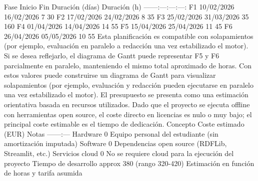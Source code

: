{}\markdownRendererPipe{} Fase \markdownRendererPipe{} Inicio \markdownRendererPipe{} Fin \markdownRendererPipe{} Duración (días) \markdownRendererPipe{} Duración (h) \markdownRendererPipe{} \markdownRendererPipe{}---\markdownRendererPipe{}---:\markdownRendererPipe{}---:\markdownRendererPipe{}---:\markdownRendererPipe{}---:\markdownRendererPipe{} \markdownRendererPipe{} F1 \markdownRendererPipe{} 10/02/2026 \markdownRendererPipe{} 16/02/2026 \markdownRendererPipe{} 7 \markdownRendererPipe{} 30 \markdownRendererPipe{} \markdownRendererPipe{} F2 \markdownRendererPipe{} 17/02/2026 \markdownRendererPipe{} 24/02/2026 \markdownRendererPipe{} 8 \markdownRendererPipe{} 35 \markdownRendererPipe{} \markdownRendererPipe{} F3 \markdownRendererPipe{} 25/02/2026 \markdownRendererPipe{} 31/03/2026 \markdownRendererPipe{} 35 \markdownRendererPipe{} 160 \markdownRendererPipe{} \markdownRendererPipe{} F4 \markdownRendererPipe{} 01/04/2026 \markdownRendererPipe{} 14/04/2026 \markdownRendererPipe{} 14 \markdownRendererPipe{} 55 \markdownRendererPipe{} \markdownRendererPipe{} F5 \markdownRendererPipe{} 15/04/2026 \markdownRendererPipe{} 25/04/2026 \markdownRendererPipe{} 11 \markdownRendererPipe{} 45 \markdownRendererPipe{} \markdownRendererPipe{} F6 \markdownRendererPipe{} 26/04/2026 \markdownRendererPipe{} 05/05/2026 \markdownRendererPipe{} 10 \markdownRendererPipe{} 55 \markdownRendererPipe{}\markdownRendererInterblockSeparator
{}Esta planificación es compatible con solapamientos (por ejemplo, evaluación en paralelo a redacción una vez estabilizado el motor). Si se desea reflejarlo, el diagrama de Gantt puede representar F5 y F6 parcialmente en paralelo, manteniendo el mismo total aproximado de horas.\markdownRendererInterblockSeparator
{}Con estos valores puede construirse un diagrama de Gantt para visualizar solapamientos (por ejemplo, evaluación y redacción pueden ejecutarse en paralelo una vez estabilizado el motor).\markdownRendererInterblockSeparator
{}\markdownRendererInterblockSeparator
{}El presupuesto se presenta como una estimación orientativa basada en recursos utilizados. Dado que el proyecto se ejecuta offline con herramientas open source, el coste directo en licencias es nulo o muy bajo; el principal coste estimable es el tiempo de dedicación.\markdownRendererInterblockSeparator
{}\markdownRendererPipe{} Concepto \markdownRendererPipe{} Coste estimado (EUR) \markdownRendererPipe{} Notas \markdownRendererPipe{} \markdownRendererPipe{}---\markdownRendererPipe{}---:\markdownRendererPipe{}---\markdownRendererPipe{} \markdownRendererPipe{} Hardware \markdownRendererPipe{} 0 \markdownRendererPipe{} Equipo personal del estudiante (sin amortización imputada) \markdownRendererPipe{} \markdownRendererPipe{} Software \markdownRendererPipe{} 0 \markdownRendererPipe{} Dependencias open source (RDFLib, Streamlit, etc.) \markdownRendererPipe{} \markdownRendererPipe{} Servicios cloud \markdownRendererPipe{} 0 \markdownRendererPipe{} No se requiere cloud para la ejecución del proyecto \markdownRendererPipe{} \markdownRendererPipe{} Tiempo de desarrollo \markdownRendererPipe{} \markdownRendererBackslash{}approx 380 (rango 320-420) \markdownRendererPipe{} Estimación en función de horas y tarifa asumida \markdownRendererPipe{}\markdownRendererInterblockSeparator
